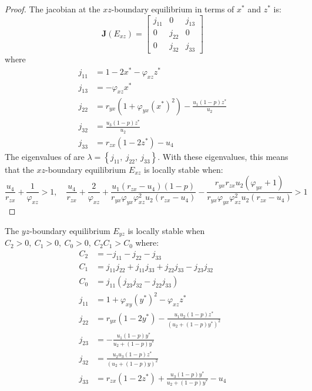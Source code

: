 \begin{proof}
    The jacobian at the $xz$-boundary equilibrium in terms of $x^*$ and $z^*$ is:
    \begin{equation}\label{matrix:jacobian-boundary-xz}
        \textbf{J}\left(E_{xz}\right) = \begin{bmatrix}
            j_{11} & 0 & j_{13}\\
            0 & j_{22} & 0\\
            0 & j_{32} & j_{33}
        \end{bmatrix}
    \end{equation}
    where
    \begin{align*}
        j_{11} &= 1-2x^*-\varphi_{xz}z^*\\
        j_{13} &= -\varphi_{xz}x^*\\
        j_{22} &= r_{yx}\left(1+\varphi_{yx}\left(x^*\right)^2\right)-\frac{u_1\left(1-p\right)z^*}{u_2}\\
        j_{32} &= \frac{u_3\left(1-p\right)z^*}{u_2}\\
        j_{33} &= r_{zx}\left(1-2z^*\right)-u_4
    \end{align*}
    The eigenvalues of  are $\lambda=\left\{j_{11},\ j_{22},\ j_{33}\right\}$.
    With these eigenvalues, this means that the $xz$-boundary equilibrium $E_{xz}$ is locally stable when:
    \begin{equation*}
        \frac{u_4}{r_{zx}}+\frac{1}{\varphi_{xz}} > 1,\quad
        \frac{u_4}{r_{zx}}+\frac{2}{\varphi_{xz}}+\frac{u_1\left(r_{zx}-u_4\right)\left(1-p\right)}{r_{yx}\varphi_{yx}\varphi_{xz}^2u_2\left(r_{zx}-u_4\right)}-\frac{r_{yx}r_{zx}u_2\left(\varphi_{yx}+1\right)}{r_{yx}\varphi_{yx}\varphi_{xz}^2u_2\left(r_{zx}-u_4\right)} > 1
    \end{equation*}
\end{proof}
\begin{theorem}\label{thm:boundary-yz-stability}
    The $yz$-boundary equilibrium $E_{yz}$ is locally stable when $C_2>0,\ C_1>0,\ C_0>0,\ C_2C_1>C_0$ where:
    \begin{align*}
        C_2 &= -j_{11}-j_{22}-j_{33}\\
        C_1 &= j_{11}j_{22}+j_{11}j_{33}+j_{22}j_{33}-j_{23}j_{32}\\
        C_0 &= j_{11}\left(j_{23}j_{32}-j_{22}j_{33}\right)\\
        j_{11} &= 1+\varphi_{xy}\left(y^*\right)^2-\varphi_{xz}z^*\\
        j_{22} &= r_{yx}\left(1-2y^*\right)-\frac{u_1u_2\left(1-p\right)z^*}{\left(u_2+\left(1-p\right)y^*\right)^2}\\
        j_{23} &= -\frac{u_1\left(1-p\right)y^*}{u_2+\left(1-p\right)y^*}\\
        j_{32} &= \frac{u_2u_3\left(1-p\right)z^*}{\left(u_2+\left(1-p\right)y\right)^2}\\
        j_{33} &= r_{zx}\left(1-2z^*\right)+\frac{u_3\left(1-p\right)y^*}{u_2+\left(1-p\right)y^*}-u_4
    \end{align*}
\end{theorem}
